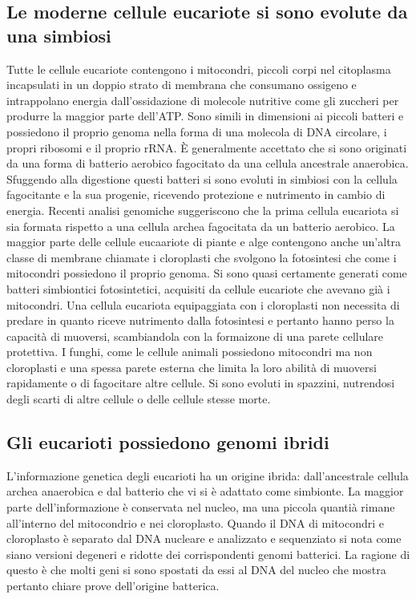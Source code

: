 \subsection{Le moderne cellule eucariote si sono evolute da una simbiosi}
Tutte le cellule eucariote contengono i mitocondri, piccoli corpi nel citoplasma incapsulati in un doppio strato di membrana che consumano ossigeno e intrappolano energia 
dall'ossidazione di molecole nutritive come gli zuccheri per produrre la maggior parte dell'ATP. Sono simili in dimensioni ai piccoli batteri e possiedono il proprio genoma nella forma
di una molecola di DNA circolare, i propri ribosomi e il proprio rRNA. \`E generalmente accettato che si sono originati da una forma di batterio aerobico fagocitato da una cellula
ancestrale anaerobica. Sfuggendo alla digestione questi batteri si sono evoluti in simbiosi con la cellula fagocitante e la sua progenie, ricevendo protezione e nutrimento in cambio di
energia. Recenti analisi genomiche suggeriscono che la prima cellula eucariota si sia formata rispetto a una cellula archea fagocitata da un batterio aerobico. La maggior parte delle
cellule eucaariote di piante e alge contengono anche un'altra classe di membrane chiamate i cloroplasti che svolgono la fotosintesi che come i mitocondri possiedono il proprio genoma.
Si sono quasi certamente generati come batteri simbiontici fotosintetici, acquisiti da cellule eucariote che avevano gi\`a i mitocondri. Una cellula eucariota equipaggiata con i 
cloroplasti non necessita di predare in quanto riceve nutrimento dalla fotosintesi e pertanto hanno perso la capacit\`a di muoversi, scambiandola con la formaizone di una parete 
cellulare protettiva. I funghi, come le cellule animali possiedono mitocondri ma non cloroplasti e una spessa parete esterna che limita la loro abilit\`a di muoversi rapidamente o di 
fagocitare altre cellule. Si sono evoluti in spazzini, nutrendosi degli scarti di altre cellule o delle cellule stesse morte.
\subsection{Gli eucarioti possiedono genomi ibridi}
L'informazione genetica degli eucarioti ha un origine ibrida: dall'ancestrale cellula archea anaerobica e dal batterio che vi si \`e adattato come simbionte. La maggior parte 
dell'informazione \`e conservata nel nucleo, ma una piccola quanti\`a rimane all'interno del mitocondrio e nei cloroplasto. Quando il DNA di mitocondri e cloroplasto \`e separato dal 
DNA nucleare e analizzato e sequenziato si nota come siano versioni degeneri e ridotte dei corrispondenti genomi batterici. La ragione di questo \`e che molti geni si sono spostati da
essi al DNA del nucleo che mostra pertanto chiare prove dell'origine batterica.
